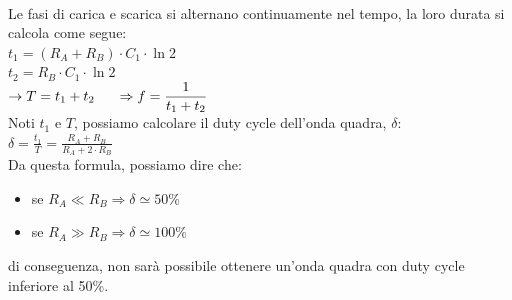 \documentclass{report}
\begin{document}
\\Le fasi di carica e scarica si alternano continuamente nel tempo, la loro durata si calcola come segue:
\\[4pt]\indent$\displaystyle{t_1 = (R_A+R_B)\cdot C_1\cdot \ln2}$
\\[4pt]\indent$\displaystyle{t_2 = R_B\cdot C_1\cdot \ln2}$
\\[4pt]\indent$\displaystyle{\rightarrow T=t_1+t_2\indent\Rightarrow f=\frac{1}{t_1+t_2}}$
\\[4pt]Noti $t_1$ e $T$, possiamo calcolare il duty cycle dell'onda quadra, $\delta$:
\\[4pt]\indent$\displaystyle{\delta=\frac{t_1}{T}=\frac{R_A+R_B}{R_A+2\cdot R_B}}$
\\[8pt] Da questa formula, possiamo dire che:
\begin{itemize}
\item se $\displaystyle{R_A\ll R_B\Rightarrow\delta\simeq 50\%}$
\item se $\displaystyle{R_A\gg R_B\Rightarrow\delta\simeq 100\%}$
\end{itemize}
di conseguenza, non sarà possibile ottenere un'onda quadra con duty cycle inferiore al 50\%.
\end{document}
